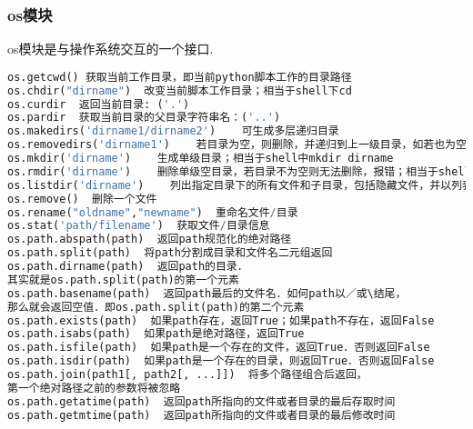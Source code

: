 \subsubsection{os模块}
os模块是与操作系统交互的一个接口.
\begin{lstlisting}[language=python]
os.getcwd() 获取当前工作目录，即当前python脚本工作的目录路径
os.chdir("dirname")  改变当前脚本工作目录；相当于shell下cd
os.curdir  返回当前目录: ('.')
os.pardir  获取当前目录的父目录字符串名：('..')
os.makedirs('dirname1/dirname2')    可生成多层递归目录
os.removedirs('dirname1')    若目录为空，则删除，并递归到上一级目录，如若也为空，则删除，依此类推
os.mkdir('dirname')    生成单级目录；相当于shell中mkdir dirname
os.rmdir('dirname')    删除单级空目录，若目录不为空则无法删除，报错；相当于shell中rmdir dirname
os.listdir('dirname')    列出指定目录下的所有文件和子目录，包括隐藏文件，并以列表方式打印
os.remove()  删除一个文件
os.rename("oldname","newname")  重命名文件/目录
os.stat('path/filename')  获取文件/目录信息
os.path.abspath(path)  返回path规范化的绝对路径
os.path.split(path)  将path分割成目录和文件名二元组返回
os.path.dirname(path)  返回path的目录．
其实就是os.path.split(path)的第一个元素
os.path.basename(path)  返回path最后的文件名．如何path以／或\结尾，
那么就会返回空值．即os.path.split(path)的第二个元素
os.path.exists(path)  如果path存在，返回True；如果path不存在，返回False
os.path.isabs(path)  如果path是绝对路径，返回True
os.path.isfile(path)  如果path是一个存在的文件，返回True．否则返回False
os.path.isdir(path)  如果path是一个存在的目录，则返回True．否则返回False
os.path.join(path1[, path2[, ...]])  将多个路径组合后返回，
第一个绝对路径之前的参数将被忽略
os.path.getatime(path)  返回path所指向的文件或者目录的最后存取时间
os.path.getmtime(path)  返回path所指向的文件或者目录的最后修改时间
\end{lstlisting}